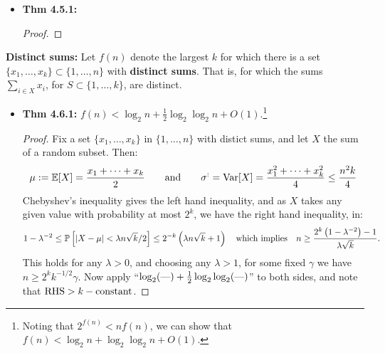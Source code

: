 \documentclass[11pt]{article}
\newenvironment{INT}[1][]{\begin{itemize}\small\item\textbf{#1}}{\end{itemize}}
\begin{document}
\begin{chapter4}
\begin{itemise}
\begin{INT}[Thm 4.5.1:]
\begin{proof}
\end{proof}
\end{INT}
\item \textbf{Distinct sums:} Let $f(n)$ denote the largest $k$ for which there is a set $\{x_1,\ldots,x_k\}\subset\{1,\ldots,n\}$ with \textbf{distinct sums}. That is, for which the sums $\sum_{i\in X}x_i$, for $S\subset\{1,\ldots,k\}$, are distinct.
\begin{INT}[Thm 4.6.1:]
$f(n)<\log_2n+\frac{1}{2}\log_2\log_2n+O(1)$.\footnote{Noting that $2^{f(n)}<nf(n)$, we can show that $f(n)<\log_2n+\log_2\log_2n+O(1)$.}
\begin{proof}
Fix a set $\{x_1,\ldots,x_k\}$ in $\{1,\ldots,n\}$ with distict sums, and let $X$ the sum of a random subset. Then:
\[\mu:=\operatorname{\mathbb{E}}[X]=\frac{x_1+\cdots+x_k}{2}\textup{\qquad and\qquad}\sigma^:=\operatorname{Var}[X]=\frac{x_1^2+\cdots+x_k^2}{4}\leq\frac{n^2k}{4}\]
Chebyshev's inequality gives the left hand inequality, and as $X$ takes any given value with probability at most $2^k$, we have the right hand inequality, in:
\[1-\lambda^{-2}\leq
\operatorname{\mathbb{P}}\left[|X-\mu|<\lambda n\sqrt{k}/2\right]\leq
2^{-k}\left(\lambda n\sqrt{k}+1\right)\textup{\quad which implies\quad }
n\geq\frac{2^k\left(1-\lambda^{-2}\right)-1}{\lambda\sqrt k}.\]
This holds for any $\lambda>0$, and choosing any $\lambda>1$, for some fixed $\gamma$ we have $n\geq 2^kk^{-1/2}\gamma$. Now apply ``$\log_2(\textup{---})+\frac{1}{2}\log_2\log_2(\textup{---})$'' to both sides, and note that $\textup{RHS}>k-\textup{constant}$.
\end{proof}

\end{INT}
\end{itemise}

\end{chapter4}
\end{document}

